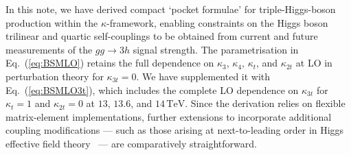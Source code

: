 \documentclass{SciPost}
\providecommand{\DIFaddtex}[1]{{\protect\color{red} #1}} %
\providecommand{\DIFdeltex}[1]{} %
\providecommand{\DIFaddbegin}{} %
\providecommand{\DIFaddend}{} %
\providecommand{\DIFdelbegin}{} %
\providecommand{\DIFdelend}{} %
\providecommand{\DIFadd}[1]{\texorpdfstring{\DIFaddtex{#1}}{#1}} %
\providecommand{\DIFdel}[1]{\texorpdfstring{\DIFdeltex{#1}}{}} %
\begin{document}
In this note, we have derived compact \DIFdelbegin \DIFdel{``pocket formulas'' for triple-Higgs }\DIFdelend \DIFaddbegin \DIFadd{`pocket formulae' for triple-Higgs-boson }\DIFaddend production within the $\kappa$-framework, enabling constraints on the Higgs \DIFaddbegin \DIFadd{boson }\DIFaddend trilinear and quartic self-couplings to be obtained from current and future measurements of the $gg \to 3h$ signal strength. The \DIFdelbegin \DIFdel{resulting parameterisations retain }\DIFdelend \DIFaddbegin \DIFadd{parametrisation in Eq.~(\ref{eq:BSMLO}) retains }\DIFaddend the full dependence on $\kappa_3$, $\kappa_4$, $\kappa_t$, and $\kappa_{2t}$ at LO in perturbation theory \DIFdelbegin \DIFdel{. Since their }\DIFdelend \DIFaddbegin \DIFadd{for $\kappa_{3t}=0$. We have supplemented it with Eq.~(\ref{eq:BSMLO3t}), which includes the complete LO dependence on $\kappa_{3t}$ for $\kappa_t=1$ and $\kappa_{2t}=0$ at $13$, $13.6$, and $14\,\mathrm{TeV}$. Since the }\DIFaddend derivation relies on \DIFdelbegin \DIFdel{the flexible and efficient }\DIFdelend \DIFaddbegin \DIFadd{flexible }\DIFaddend matrix-element \DIFdelbegin \DIFdel{implementation developed in~Ref.~\cite{Campbell:2025llb}, the extension of these formulas }\DIFdelend \DIFaddbegin \DIFadd{implementations, further extensions }\DIFaddend to incorporate additional coupling modifications --- such as those arising at next-to-leading order in \DIFdelbegin \DIFdel{the Higgs Effective Field Theory}\DIFdelend \DIFaddbegin \DIFadd{Higgs effective field theory}\DIFaddend ~\cite{Brivio:2025sib} --- \DIFdelbegin \DIFdel{is~}\DIFdelend \DIFaddbegin \DIFadd{are }\DIFaddend comparatively straightforward.
\end{document}
